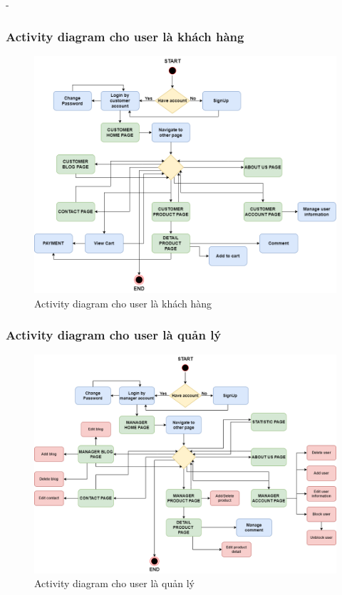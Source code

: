 \begin {list} {-}{}
\subsubsection{Activity diagram cho user là khách hàng}
\begin{figure}[H]
    \centering
    \includegraphics[scale=0.45]{images/hieu/chap-3/user-activity-diagram.png}
    \caption{Activity diagram cho user là khách hàng}
\end{figure}

\newpage
\subsubsection{Activity diagram cho user là quản lý}
\begin{figure}[H]
    \centering
    \includegraphics[scale=0.4]{images/hieu/chap-3/admin-activity-diagram.png}
    \caption{Activity diagram cho user là quản lý}
\end{figure}
\newpage

\end{list}
